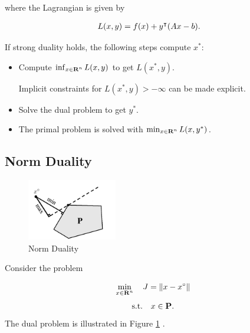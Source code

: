 \documentclass{article}
\begin{document}
where the Lagrangian is given by

\begin{align*}
    L(x,y) &= f(x)+ y^\intercal (A x - b).
\end{align*}

If strong duality holds, the following steps compute $x^*$:
\begin{itemize}
    
    \item Compute $\inf_{x\in\textbf{R}^n}L(x,y)$ to get $L(x^*,y)$.
    

    Implicit constraints for $L(x^*,y)>-\infty$ can be made explicit.
    
    \item Solve the dual problem to get $y^*$.
    
    \item  The primal problem is solved with $\min_{x\in\textbf{R}^n}L(x,y^*)$.
    
\end{itemize}


\subsection{Norm Duality}

    \begin{figure}[h!]
        \centering
        \includegraphics[width=0.35\textwidth]{./figs/dual.png}
        \caption{Norm Duality}
        \label{fig:dual}
    \end{figure}

    Consider the problem

    \begin{align*}
        \min_{x\in\textbf{R}^n}\quad J = \|x-x^\circ\|
    \end{align*}
    \begin{align*}
        \text{s.t.} \quad x\in\textbf{P}.
    \end{align*}
    The dual problem is illustrated in Figure \ref{fig:dual} \cite[p.~9]{luenberger}.
\end{document}
